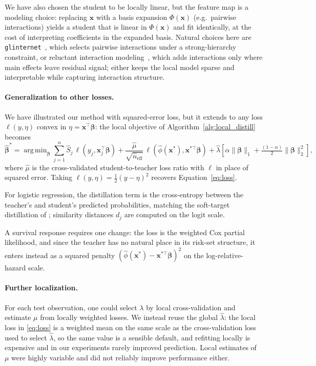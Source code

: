 \documentclass[12pt]{article}
\DeclareMathOperator*{\argmin}{arg\,min}
\theoremstyle{definition}
\begin{document}
We have also chosen the student to be locally linear, but the feature map is a modeling choice: replacing $\bm{x}$ with a basis expansion $\Phi(\bm{x})$ (e.g.\ pairwise interactions) yields a student that is linear in $\Phi(\bm{x})$ and fit identically, at the cost of interpreting coefficients in the expanded basis. 
Natural choices here are \texttt{glinternet}~\cite{lim2015learning}, which selects pairwise interactions under a strong-hierarchy constraint, or reluctant interaction modeling~\cite{yu2019reluctant}, which adds interactions only where main effects leave residual signal; either keeps the local model sparse and interpretable while capturing interaction structure.

\paragraph{Generalization to other losses.} We have illustrated our method with squared-error loss, but it extends to any loss $\ell(y,\eta)$ convex in $\eta = \bm{x}^\top\bm\beta$: the local objective of Algorithm~\ref{alg:local_distill} becomes
\begin{equation}
  \hat{\bm\beta}^* = \argmin_{\bm\beta}
    \sum_{j=1}^{n} \hat{S}_j\,\ell(y_j, \bm{x}_j^\top\bm\beta)
    + \frac{\hat\mu}{\sqrt{\hat n_{\text{eff}}}}\,\ell(\hat\phi(\bm{x}^*), \bm{x}^{*\top}\bm\beta)
    + \hat\lambda[\alpha\|\bm\beta\|_1 + \tfrac{(1-\alpha)}{2}\|\bm\beta\|_2^2],
  \label{eq:general_loss}
\end{equation}
where $\hat\mu$ is the cross-validated student-to-teacher loss ratio with $\ell$ in place of squared error. Taking $\ell(y, \eta) = \tfrac{1}{2}(y-\eta)^2$ recovers Equation~\eqref{eq:loss}.

For logistic regression, the distillation term is the cross-entropy between the teacher's and student's predicted probabilities, matching the soft-target distillation of \citet{hinton2015distilling}; similarity distances $d_j$ are computed on the logit scale. 

A survival response requires one change: the loss is the weighted Cox partial likelihood, and since the teacher has no natural place in its risk-set structure, it enters instead as a squared penalty $(\hat\phi(\bm{x}^*) - \bm{x}^{*\top}\bm\beta)^2$ on the log-relative-hazard scale. 

\paragraph{Further localization.} For each test observation, one could select $\lambda$ by local cross-validation and estimate $\mu$ from locally weighted losses. We instead reuse the global $\hat\lambda$: the local loss in \eqref{eq:loss} is a weighted mean on the same scale as the cross-validation loss used to select $\hat\lambda$, so the same value is a sensible default, and refitting locally is expensive and in our experiments rarely improved prediction. Local estimates of $\mu$ were highly variable and did not reliably improve performance either.
\end{document}
